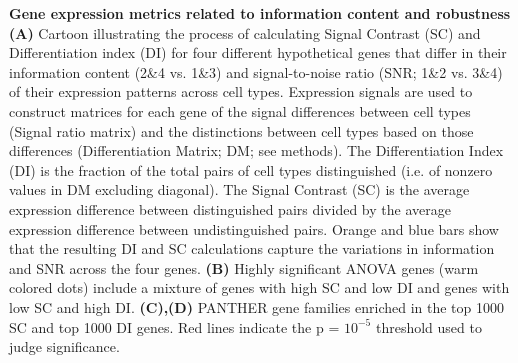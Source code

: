 \textbf{Gene expression metrics related to information content and robustness} \textbf{(A)} Cartoon illustrating the process of calculating Signal Contrast (SC) and Differentiation index (DI) for four different hypothetical genes that differ in their information content (2\&4 vs. 1\&3) and signal-to-noise ratio (SNR; 1\&2 vs. 3\&4) of their expression patterns across cell types. Expression signals are used to construct matrices for each gene of the signal differences between cell types (Signal ratio matrix) and the distinctions between cell types based on those differences (Differentiation Matrix; DM; see methods). The Differentiation Index (DI) is the fraction of the total pairs of cell types distinguished (i.e. of nonzero values in DM excluding diagonal). The Signal Contrast (SC) is the average expression difference between distinguished pairs divided by the average expression difference between undistinguished pairs. Orange and blue bars show that the resulting DI and SC calculations capture the variations in information and SNR across the four genes. \textbf{(B)} Highly significant ANOVA genes (warm colored dots) include a mixture of genes with high SC and low DI and genes with low SC and high DI. \textbf{(C),(D)} PANTHER gene families enriched in the top 1000 SC and top 1000 DI genes. Red lines indicate the p = $10^{-5}$ threshold used to judge significance. 